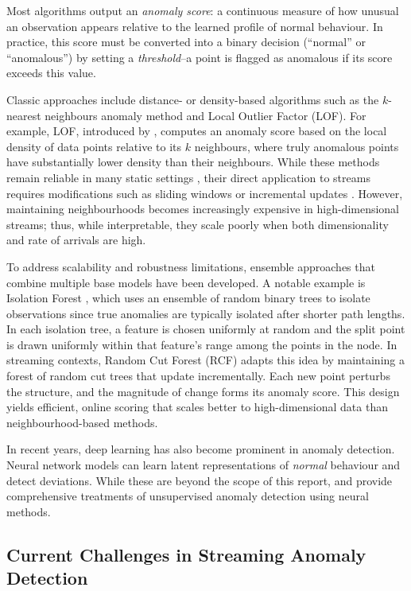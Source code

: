 \documentclass{statsmsc}
\begin{document}
Most algorithms output an \emph{anomaly score}: a continuous measure of how unusual an observation appears relative to the 
learned profile of normal behaviour. In practice, this score must be converted into a binary decision 
(``normal'' or ``anomalous'') by setting a \emph{threshold}--a point is flagged as anomalous if its score exceeds this value. 

Classic approaches include distance- or density-based algorithms such as the $k$-nearest 
neighbours anomaly method and Local Outlier Factor (LOF). For example, LOF, introduced by \citet{breunig2000lof}, 
computes an anomaly score based on the local density of data points relative to its $k$ neighbours, 
where truly anomalous points have substantially lower density than their neighbours. 
While these methods remain reliable in many static settings \citep{campos2016evaluation}, 
their direct application to streams requires modifications such as sliding windows or incremental updates \citep{Aggarwal2007}. 
However, maintaining neighbourhoods becomes increasingly expensive in high-dimensional streams;
thus, while interpretable, they scale poorly when both dimensionality and rate of arrivals are high.

To address scalability and robustness limitations, ensemble approaches that combine multiple base models have been developed. 
A notable example is Isolation Forest \citep{liu2008isolation}, which uses an ensemble of random binary trees to 
isolate observations since true anomalies are typically isolated after shorter path lengths. In each isolation tree, 
a feature is chosen uniformly at random and the split point is drawn uniformly within that feature's range among the points in the node. 
In streaming contexts, Random Cut Forest (RCF) \citep{guha2016robust} adapts this idea by maintaining a forest of random cut 
trees that update incrementally. Each new point perturbs the structure, and the magnitude of change forms its anomaly score. 
This design yields efficient, online scoring that scales better to high-dimensional data than neighbourhood-based methods.

In recent years, deep learning has also become prominent in anomaly detection. 
Neural network models can learn latent representations of \emph{normal} behaviour and detect deviations. While these are beyond
the scope of this report, \citet{zhai2016deep} and \citet{zong2018deep} provide comprehensive treatments 
of unsupervised anomaly detection using neural methods.

\subsection{Current Challenges in Streaming Anomaly Detection}\label{subsec:challenges}
\end{document}
